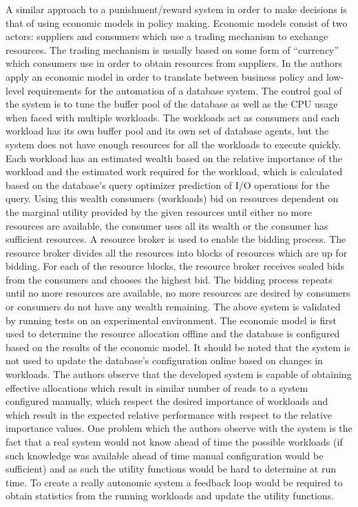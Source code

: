 A similar approach to a punishment/reward system in order to make decisions is that of using economic models in policy making. Economic models consist of two actors: suppliers and consumers which use a trading mechanism to exchange resources. The trading mechanism is usually based on some form of ``currency'' which consumers use in order to obtain resources from suppliers. In \cite{related:econmodel} the authors apply an economic model in order to translate between business policy and low-level requirements for the automation of a database system. The control goal of the system is to tune the buffer pool of the database as well as the CPU usage when faced with multiple workloads. The workloads act as consumers and each workload has its own buffer pool and its own set of database agents, but the system does not have enough resources for all the workloads to execute quickly. Each workload has an estimated wealth based on the relative importance of the workload and the estimated work required for the workload, which is calculated based on the database's query optimizer prediction of I/O operations for the query. Using this wealth consumers (workloads) bid on resources dependent on the marginal utility provided by the given resources until either no more resources are available, the consumer uses all its wealth or the consumer has sufficient resources. A resource broker is used to enable the bidding process. The resource broker divides all the resources into blocks of resources which are up for bidding. For each of the resource blocks, the resource broker receives sealed bids from the consumers and chooses the highest bid. The bidding process repeats until no more resources are available, no more resources are desired by consumers or consumers do not have any wealth remaining. The above system is validated by running tests on an experimental environment. The economic model is first used to determine the resource allocation offline and the database is configured based on the results of the economic model. It should be noted that the system is not used to update the database's configuration online based on changes in workloads. The authors observe that the developed system is capable of obtaining effective allocations which result in similar number of reads to a system configured manually, which respect the desired importance of workloads and which result in the expected relative performance with respect to the relative importance values. One problem which the authors observe with the system is the fact that a real system would not know ahead of time the possible workloads (if such knowledge was available ahead of time manual configuration would be sufficient) and as such the utility functions would be hard to determine at run time. To create a really autonomic system a feedback loop would be required to obtain statistics from the running workloads and update the utility functions.

